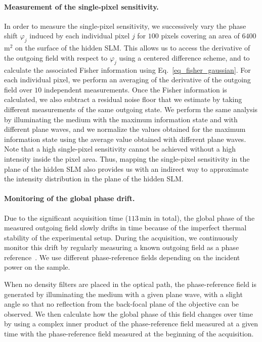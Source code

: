 \documentclass[aps,pra,twocolumn,amsmath,amssymb,superscriptaddress,10pt,nobibnotes]{revtex4-2}
\begin{document}
\paragraph*{Measurement of the single-pixel sensitivity.} 
In order to measure the single-pixel sensitivity, we successively vary the phase shift $\varphi_j$ induced by each individual pixel $j$ for $100$ pixels covering an area of $6400$\,\textmu m$^2$ on the surface of the hidden SLM. This allows us to access the derivative of the outgoing field with respect to $\varphi_j$ using a centered difference scheme, and to calculate the associated Fisher information using Eq.~\eqref{eq_fisher_gaussian}. For each individual pixel, we perform an averaging of the derivative of the outgoing field over $10$ independent measurements. Once the Fisher information is calculated, we also subtract a residual noise floor that we estimate by taking different measurements of the same outgoing state. We perform the same analysis by illuminating the medium with the maximum information state and with different plane waves, and we normalize the values obtained for the maximum information state using the average value obtained with different plane waves. Note that a high single-pixel sensitivity cannot be achieved without a high intensity inside the pixel area. Thus, mapping the single-pixel sensitivity in the plane of the hidden SLM also provides us with an indirect way to approximate the intensity distribution in the plane of the hidden SLM. 


\paragraph*{Monitoring of the global phase drift.}
Due to the significant acquisition time ($113$\,min in total), the global phase of the measured outgoing field slowly drifts in time because of the imperfect thermal stability of the experimental setup. During the acquisition, we continuously monitor this drift by regularly measuring a known outgoing field as a phase reference~\cite{pai_optical_2020}. We use different phase-reference fields depending on the incident power on the sample. 

When no density filters are placed in the optical path, the phase-reference field is generated by illuminating the medium with a given plane wave, with a slight angle so that no reflection from the back-focal plane of the objective can be observed. We then calculate how the global phase of this field changes over time by using a complex inner product of the phase-reference field measured at a given time with the phase-reference field measured at the beginning of the acquisition.
\end{document}
